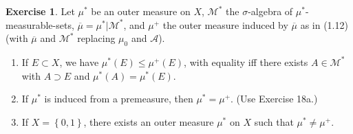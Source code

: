 \documentclass{article}
\theoremstyle{definition}
\newtheorem{ex}{Exercise}
\begin{document}
\begin{ex}
	Let $\mu^*$ be an outer measure on $X$, $\mathscr{M}^*$ the $\sigma$-algebra of $\mu^*$-measurable-sets, $\overline{\mu} = \mu^*|\mathscr{M}^*$, and $\mu^+$ the outer measure induced by $\overline{\mu}$ as in (1.12) (with $\overline{\mu}$ and $\mathscr{M}^*$ replacing $\mu_0$ and $\mathscr{A}$).
	\begin{enumerate}[label=\textbf{\alph*.}]
		\item If $E \subset X$, we have $\mu^*(E) \leq \mu^+(E)$, with equality iff there exists $A \in \mathscr{M}^*$ with $A \supset E$ and $\mu^*(A) = \mu^*(E)$.
		\item If $\mu^*$ is induced from a premeasure, then $\mu^* = \mu^+$. (Use Exercise 18a.)
		\item If $X = \left\lbrace 0, 1 \right\rbrace$, there exists an outer measure $\mu^*$ on $X$ such that $\mu^* \neq \mu^+$.
	\end{enumerate}
\end{ex}
\end{document}
